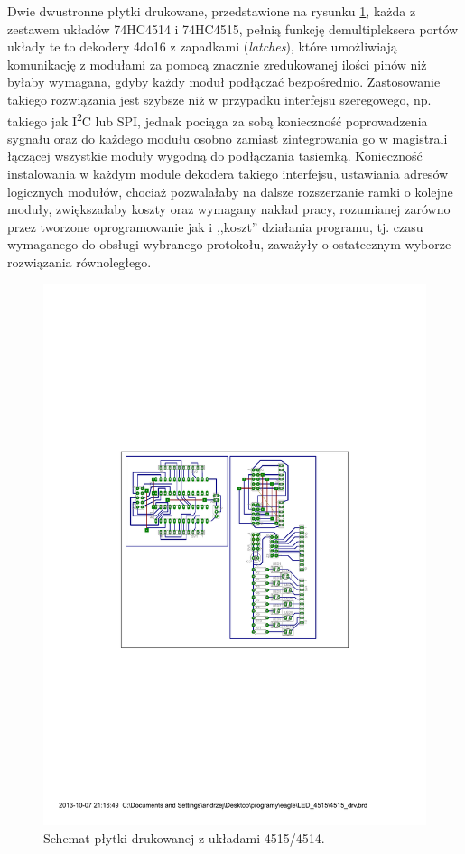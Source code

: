 Dwie dwustronne płytki drukowane, przedstawione na rysunku \ref{fig:4515_pcb}, każda z zestawem układów 74HC4514 i 74HC4515, pełnią funkcję demultipleksera portów \pauza układy te to dekodery 4\ppauza{}do\ppauza{}16 z zapadkami (\textsl{latches}), które umożliwiają komunikację z modułami za pomocą znacznie zredukowanej ilości pinów niż byłaby wymagana, gdyby każdy moduł podłączać bezpośrednio.
Zastosowanie takiego rozwiązania jest szybsze niż w przypadku interfejsu szeregowego, np. takiego jak I\textsuperscript{2}C lub SPI, jednak pociąga za sobą konieczność poprowadzenia sygnału  oraz  do każdego modułu osobno zamiast zintegrowania go w magistrali łączącej wszystkie moduły wygodną do podłączania tasiemką.
Konieczność instalowania w każdym module dekodera takiego interfejsu, ustawiania adresów logicznych modułów, chociaż pozwalałaby na dalsze rozszerzanie ramki o kolejne moduły, zwiększałaby koszty oraz wymagany nakład pracy, rozumianej zarówno przez tworzone oprogramowanie jak i ,,koszt'' działania programu, tj. czasu wymaganego do obsługi wybranego protokołu, zaważyły o ostatecznym wyborze rozwiązania równoległego.

\begin{figure}
  \centering
  \includegraphics{gfx/4515_drvpcb}
  \caption{Schemat płytki drukowanej z układami 4515/4514.}
  \label{fig:4515_pcb}
\end{figure}

